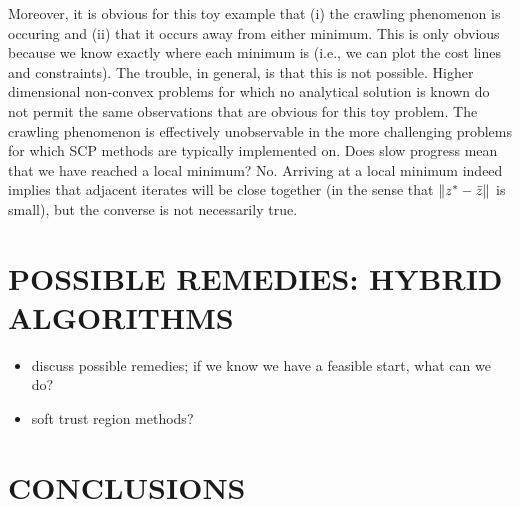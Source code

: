 \documentclass[letterpaper, 10 pt, conference]{ieeeconf}
\begin{document}
Moreover, it is obvious for this toy example that (i) the crawling phenomenon is occuring and (ii) that it occurs away from either minimum. This is only obvious because we know exactly where each minimum is (i.e., we can plot the cost lines and constraints). The trouble, in general, is that this is not possible. Higher dimensional non-convex problems for which no analytical solution is known do not permit the same observations that are obvious for this toy problem. The crawling phenomenon is effectively unobservable in the more challenging problems for which SCP methods are typically implemented on. Does slow progress mean that we have reached a local minimum? No. Arriving at a local minimum indeed implies that adjacent iterates will be close together (in the sense that $\|z^*-\bar{z}\|$ is small), but the converse is not necessarily true. 





\section{POSSIBLE REMEDIES: HYBRID ALGORITHMS}

\begin{itemize}
\item discuss possible remedies; if we know we have a feasible start, what can we do?
\item soft trust region methods?
\end{itemize}

\section{CONCLUSIONS}


\end{document}
